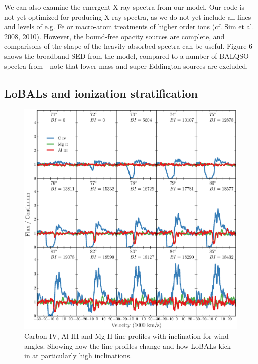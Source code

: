 \documentclass[preprint, a4paper, 11pt]{aastex}
\begin{document}
We can also examine the emergent X-ray spectra from our model. 
Our code is not yet optimized for producing X-ray spectra, as we do not yet 
include all lines and levels of e.g. Fe or macro-atom treatments of 
higher order ions (cf. Sim et al. 2008, 2010). 
However, the bound-free opacity sources are complete, and comparisons of the shape
of the heavily absorbed spectra can be useful.
Figure 6 shows the broadband SED from the model, compared to a number of BALQSO spectra
from \cite{grupenousek2015} - note that lower mass and super-Eddington sources
are excluded. 



\subsection{LoBALs and ionization stratification}

\begin{figure} %
\centering
\includegraphics[width=1.0\textwidth]{figures/c4_with_i.eps}
\caption
{
Carbon IV, Al III and Mg II line profiles with inclination for wind angles.
Showing how the line profiles change
and how LoBALs kick in at particularly high inclinations.
}
\label{fig:lobal}
\end{figure} %
\end{document}
